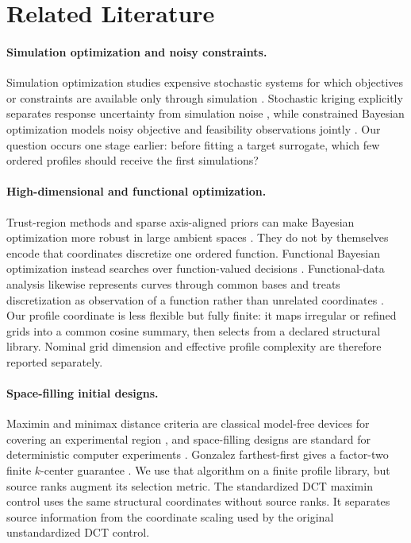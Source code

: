 \section{Related Literature}\label{sec:literature}

\paragraph{Simulation optimization and noisy constraints.}
Simulation optimization studies expensive stochastic systems for which
objectives or constraints are available only through simulation
\citep{Fu2002,AmaranEtAl2016}.  Stochastic kriging explicitly separates
response uncertainty from simulation noise \citep{AnkenmanNelsonStaum2010},
while constrained Bayesian optimization models noisy objective and feasibility
observations jointly \citep{LethamEtAl2019}.  Our question occurs one stage
earlier: before fitting a target surrogate, which few ordered profiles should
receive the first simulations?

\paragraph{High-dimensional and functional optimization.}
Trust-region methods and sparse axis-aligned priors can make Bayesian
optimization more robust in large ambient spaces
\citep{ErikssonEtAl2019,ErikssonPoloczek2021,ErikssonJankowiak2021}.  They do
not by themselves encode that coordinates discretize one ordered function.
Functional Bayesian optimization instead searches over function-valued
decisions \citep{VienEtAl2018}.  Functional-data analysis likewise represents
curves through common bases and treats discretization as observation of a
function rather than unrelated coordinates \citep{RamsaySilverman2005}.  Our
profile coordinate is less flexible but
fully finite: it maps irregular or refined grids into a common cosine summary,
then selects from a declared structural library.  Nominal grid dimension and
effective profile complexity are therefore reported separately.

\paragraph{Space-filling initial designs.}
Maximin and minimax distance criteria are classical model-free devices for
covering an experimental region \citep{JohnsonMooreYlvisaker1990}, and
space-filling designs are standard for deterministic computer experiments
\citep{MorrisMitchell1995}.  Gonzalez farthest-first gives a factor-two
finite $k$-center guarantee \citep{Gonzalez1985}.  We use that algorithm on a
finite profile library, but source ranks augment its selection metric.  The
standardized DCT maximin control uses the same structural coordinates without
source ranks.  It separates source information from the coordinate scaling
used by the original unstandardized DCT control.


